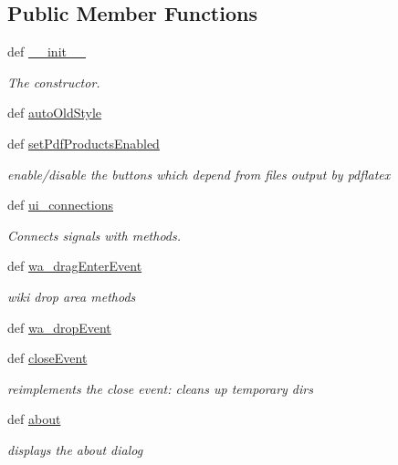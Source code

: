 \subsection*{\-Public \-Member \-Functions}
\begin{DoxyCompactItemize}
\item 
def \hyperlink{classuicilibris_1_1w2mMainWindow_a5ccc00df65d8f23d493e52b40d501aa9}{\-\_\-\-\_\-init\-\_\-\-\_\-}
\begin{DoxyCompactList}\small\item\em \-The constructor. \end{DoxyCompactList}\item 
def \hyperlink{classuicilibris_1_1w2mMainWindow_acce7cb9f3eb7c191058792d19aa372d2}{auto\-Old\-Style}
\item 
def \hyperlink{classuicilibris_1_1w2mMainWindow_a63405a7e53f8162caf4cc917954ec971}{set\-Pdf\-Products\-Enabled}
\begin{DoxyCompactList}\small\item\em enable/disable the buttons which depend from files output by pdflatex \end{DoxyCompactList}\item 
def \hyperlink{classuicilibris_1_1w2mMainWindow_a92db5c455a549b7a1a7dd6f0ae341611}{ui\-\_\-connections}
\begin{DoxyCompactList}\small\item\em \-Connects signals with methods. \end{DoxyCompactList}\item 
def \hyperlink{classuicilibris_1_1w2mMainWindow_a897d993b629f629317fff71b4c3dcaca}{wa\-\_\-drag\-Enter\-Event}
\begin{DoxyCompactList}\small\item\em wiki drop area methods \end{DoxyCompactList}\item 
def \hyperlink{classuicilibris_1_1w2mMainWindow_ad31a0058c04bb84ca92c70617e29eced}{wa\-\_\-drop\-Event}
\item 
def \hyperlink{classuicilibris_1_1w2mMainWindow_a00095aa6235477d728057cf9d7d6221a}{close\-Event}
\begin{DoxyCompactList}\small\item\em reimplements the close event\-: cleans up temporary dirs \end{DoxyCompactList}\item 
def \hyperlink{classuicilibris_1_1w2mMainWindow_a30da63be175a0f4c8f942b25c7092d60}{about}
\begin{DoxyCompactList}\small\item\em displays the about dialog \end{DoxyCompactList}\item 

\end{DoxyCompactItemize}
